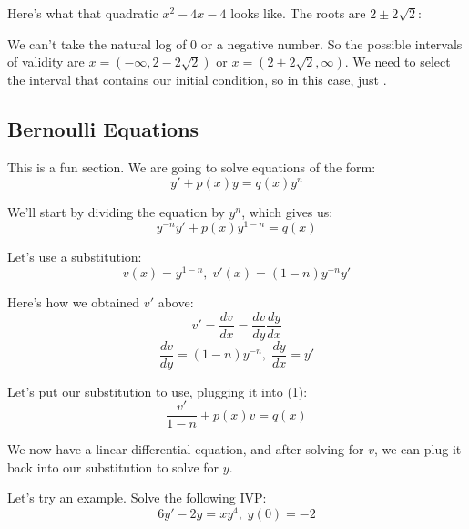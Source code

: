 	Here's what that quadratic $x^{2} - 4x - 4$ looks like. The roots are $2 \pm 2\sqrt{2}$:
	\begin{center}
	\end{center}
	
	We can't take the natural log of 0 or a negative number. So the possible intervals of validity are $x = (-\infty, 2 - 2\sqrt{2})$ or $x = (2 + 2\sqrt{2}, \infty)$. We need to select the interval that contains our initial condition, so in this case, just .
	
	\subsection{Bernoulli Equations}
	This is a fun section. We are going to solve equations of the form:
	$$y' + p(x)y = q(x)y^{n}$$
	
	We'll start by dividing the equation by $y^{n}$, which gives us:
	\begin{equation}
		y^{-n}y' + p(x)y^{1 - n} = q(x)
	\end{equation}
	
	Let's use a substitution:
	$$v(x) = y^{1 - n},\;v'(x) = (1 - n)y^{-n}y'$$
	
	Here's how we obtained $v'$ above:
	$$v' = \frac{dv}{dx} = \frac{dv}{dy}\frac{dy}{dx}$$
	$$\frac{dv}{dy} = (1 - n)y^{-n},\;\frac{dy}{dx} = y'$$
	
	Let's put our substitution to use, plugging it into (1):
	$$\frac{v'}{1 - n} + p(x)v = q(x)$$
	
	We now have a linear differential equation, and after solving for $v$, we can plug it back into our substitution to solve for $y$.
	
	Let's try an example. Solve the following IVP:
	$$6y' - 2y = xy^{4},\;y(0) = -2$$
	
